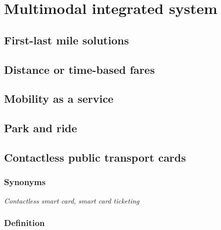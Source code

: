 \documentclass[
]{book}
\begin{document}
\hypertarget{multimodal}{%
\chapter{Multimodal integrated system}\label{multimodal}}

\hypertarget{first-last-mile-solutions}{%
\section{First-last mile solutions}\label{first-last-mile-solutions}}

\hypertarget{distance-or-time-based-fares}{%
\section{Distance or time-based fares}\label{distance-or-time-based-fares}}

\hypertarget{mobility-as-a-service}{%
\section{Mobility as a service}\label{mobility-as-a-service}}

\hypertarget{park-and-ride}{%
\section{Park and ride}\label{park-and-ride}}

\hypertarget{contactless-public-transport-cards}{%
\section{Contactless public transport cards}\label{contactless-public-transport-cards}}

\hypertarget{synonyms-4}{%
\subsection*{Synonyms}\label{synonyms-4}}

\emph{Contactless smart card, smart card ticketing}

\hypertarget{definition-4}{%
\subsection*{Definition}\label{definition-4}}
\end{document}
